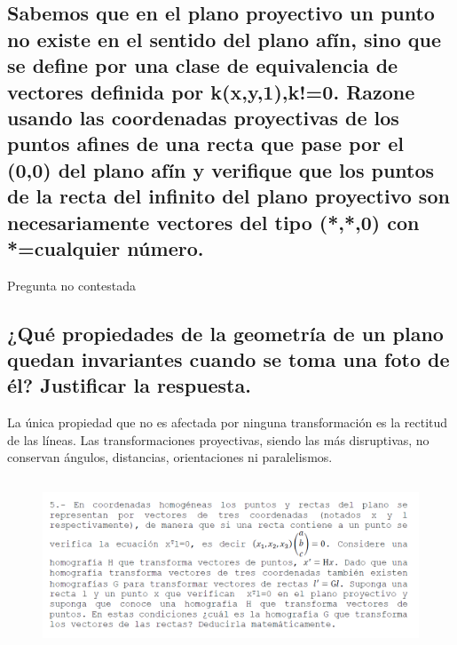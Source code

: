 \documentclass[11pt]{scrartcl} %
\begin{document}
\subsection{Sabemos que en el plano proyectivo un punto no existe en el sentido 
del plano afín, sino que se define por una clase de equivalencia de vectores 
definida por {k(x,y,1),k!=0}. Razone usando las coordenadas proyectivas de los 
puntos afines de una recta que pase por el (0,0) del plano afín y verifique que 
los puntos de la recta del infinito del plano proyectivo son necesariamente 
vectores del tipo (*,*,0) con *=cualquier número.}



Pregunta no contestada

\subsection{¿Qué propiedades de la geometría de un plano quedan invariantes 
cuando se toma una foto de él? Justificar la respuesta.}


La única propiedad que no es afectada por ninguna transformación es la 
rectitud de las líneas. \newline
Las transformaciones proyectivas, siendo las más disruptivas, no conservan 
ángulos, distancias, orientaciones ni paralelismos.


\subsection{ }
\begin{figure}[h]
	\centering
	\includegraphics[width=1.0\columnwidth]{p5.png}
\end{figure}

\end{document}
